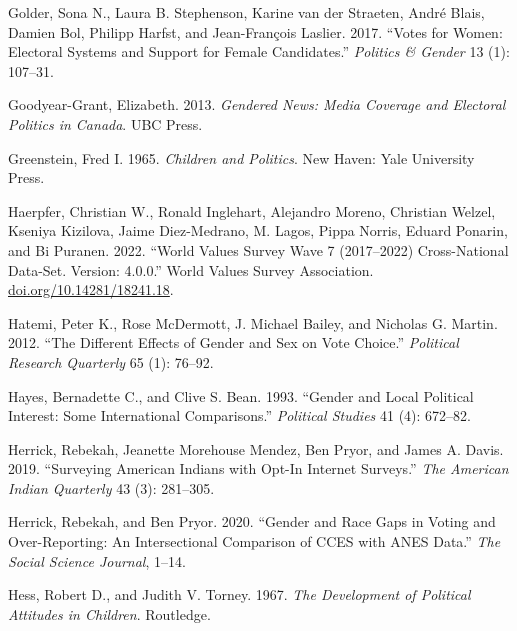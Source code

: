 \documentclass[
  letterpaper,
  DIV=11,
  numbers=noendperiod]{scrreprt}
\newlength{\cslhangindent}
\newlength{\cslentryspacingunit} %
\newenvironment{CSLReferences}[2] %
 {%
  \setlength{\parindent}{0pt}
  \ifodd #1
  \let\oldpar\par
  \def\par{\hangindent=\cslhangindent\oldpar}
  \fi
  \setlength{\parskip}{#2\cslentryspacingunit}
 }%
 {}
\begin{document}
\begin{CSLReferences}{1}{0}
\leavevmode{}%
Golder, Sona N., Laura B. Stephenson, Karine van der Straeten, André
Blais, Damien Bol, Philipp Harfst, and Jean-François Laslier. 2017.
{``{Votes for Women: Electoral Systems and Support for Female
Candidates}.''} \emph{Politics \& Gender} 13 (1): 107--31.

\leavevmode{}%
Goodyear-Grant, Elizabeth. 2013. \emph{{Gendered News: Media Coverage
and Electoral Politics in Canada}}. UBC Press.

\leavevmode{}%
Greenstein, Fred I. 1965. \emph{{Children and Politics}}. New Haven:
Yale University Press.

\leavevmode{}%
Haerpfer, Christian W., Ronald Inglehart, Alejandro Moreno, Christian
Welzel, Kseniya Kizilova, Jaime Diez-Medrano, M. Lagos, Pippa Norris,
Eduard Ponarin, and Bi Puranen. 2022. {``{World Values Survey Wave 7
(2017--2022) Cross-National Data-Set. Version: 4.0.0}.''} World Values
Survey Association.
\href{https://doi.org/10.14281/18241.18}{doi.org/10.14281/18241.18}.

\leavevmode{}%
Hatemi, Peter K., Rose McDermott, J. Michael Bailey, and Nicholas G.
Martin. 2012. {``{The Different Effects of Gender and Sex on Vote
Choice}.''} \emph{Political Research Quarterly} 65 (1): 76--92.

\leavevmode{}%
Hayes, Bernadette C., and Clive S. Bean. 1993. {``{Gender and Local
Political Interest: Some International Comparisons}.''} \emph{Political
Studies} 41 (4): 672--82.

\leavevmode{}%
Herrick, Rebekah, Jeanette Morehouse Mendez, Ben Pryor, and James A.
Davis. 2019. {``{Surveying American Indians with Opt-In Internet
Surveys}.''} \emph{The American Indian Quarterly} 43 (3): 281--305.

\leavevmode{}%
Herrick, Rebekah, and Ben Pryor. 2020. {``{Gender and Race Gaps in
Voting and Over-Reporting: An Intersectional Comparison of CCES with
ANES Data}.''} \emph{The Social Science Journal}, 1--14.

\leavevmode{}%
Hess, Robert D., and Judith V. Torney. 1967. \emph{{The Development of
Political Attitudes in Children}}. Routledge.


\end{CSLReferences}
\end{document}
